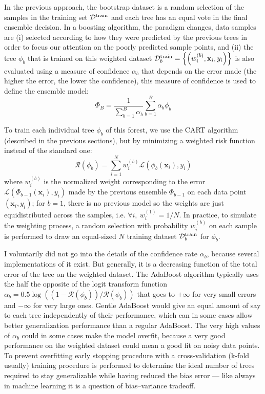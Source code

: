 \documentclass[main]{subfiles}
\begin{document}
In the previous approach, the bootstrap dataset is a random selection of the samples in the training set $\mathcal{D}^{\text{train}}$ and each tree has an equal vote in the final ensemble decision. In a boosting algorithm,\autocite{drucker1997improving} the paradigm changes, data samples are (i) selected according to how they were predicted by the previous trees in order to focus our attention on the poorly predicted sample points, and (ii) the tree $\phi_b$ that is trained on this weighted dataset $\mathcal{D}^{\text{train}}_b=\left\{\left(w_i^{(b)},\mathbf{x}_i,y_i\right)\right\}$ is also evaluated using a measure of confidence $\alpha_b$ that depends on the error made (the higher the error, the lower the confidence), this measure of confidence is used to define the ensemble model:
\begin{equation}
  \Phi_B = \frac{1}{\sum_{b=1}^{B} \alpha_b}\sum_{b=1}^{B} \alpha_b\phi_b
\end{equation}

To train each individual tree $\phi_b$ of this forest, we use the CART algorithm (described in the previous sections), but by minimizing a weighted risk function instead of the standard one:
\begin{equation}
  \mathcal{R}(\phi_b) = \sum_{i=1}^N w_i^{(b)} \mathcal{L}\left(\phi_b(\mathbf{x}_i),y_i\right)
\end{equation}
where $w_i^{(b)}$ is the normalized weight corresponding to the error $\mathcal{L}\left(\Phi_{b-1}(\mathbf{x}_i),y_i\right)$ made by the previous ensemble $\Phi_{b-1}$ on each data point $\left(\mathbf{x}_i,y_i\right)$; for $b=1$, there is no previous model so the weights are just equidistributed across the samples, i.e. $\forall i,\ w_i^{(1)}=1/N$. In practice, to simulate the weighting process, a random selection with probability $w_i^{(b)}$ on each sample is performed to draw an equal-sized $N$ training dataset $\mathcal{D}^{\text{train}}_b$ for $\phi_b$. 

I voluntarily did not go into the details of the confidence rate $\alpha_b$, because several implementations of it exist. But generally, it is a decreasing function of the total error of the tree on the weighted dataset. The AdaBoost algorithm typically uses the half the opposite of the logit transform function $\alpha_b=0.5\log\left((1-\mathcal{R}(\phi_b))/\mathcal{R}(\phi_b)\right)$ that goes to $+\infty$ for very small errors and $-\infty$ for very large ones.\autocite{Freund_1997,schapire2013explaining} Gentle AdaBoost would give an equal amount of say to each tree independently of their performance, which can in some cases allow better generalization performance than a regular AdaBoost. The very high values of $\alpha_b$ could in some cases make the model overfit, because a very good performance on the weighted dataset could mean a good fit on noisy data points.\autocite{schapire1998improved} To prevent overfitting early stopping procedure with a cross-validation (k-fold usually) training procedure is performed to determine the ideal number of trees required to stay generalizable while having reduced the bias error --- like always in machine learning it is a question of bias--variance tradeoff. 
\end{document}
